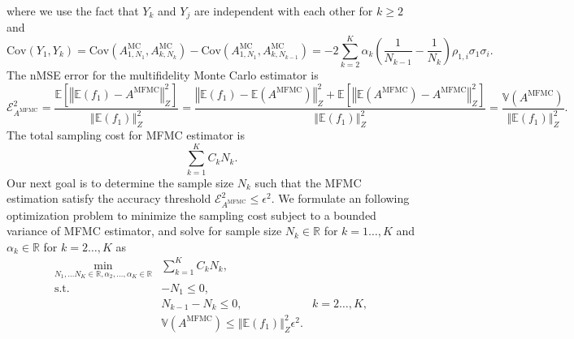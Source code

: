 \documentclass[final,3p,times,11pt]{elsarticle}
\begin{document}
where we use the fact that $Y_k$ and $Y_j$ are independent with each other for $k\ge 2$ and \cite[Lemma~3.2]{PeWiGu:2016}
\[
\text{Cov}(Y_1,Y_k) = \text{Cov}\left(A^{\text{MC}}_{1,N_1},A^{\text{MC}}_{k,N_k}\right) - \text{Cov}\left(A^{\text{MC}}_{1,N_1},A^{\text{MC}}_{k,N_{k-1}}\right) = -2 \sum_{k=2}^K \alpha_k \left(\frac{1}{N_{k-1}} - \frac{1}{N_k}\right)\rho_{1,i}\sigma_1\sigma_i.
\]
The nMSE error for the multifidelity Monte Carlo estimator is
\[
\mathcal{E}_{A^{\text{MFMC}}}^2=\frac{\mathbb E\left[\left\Vert\mathbb{E}(f_1)-A^{\text{MFMC}} \right\Vert_{Z}^2\right]}{\left\Vert\mathbb{E}(f_1) \right\Vert_{Z}^2} = \frac{\left\Vert\mathbb{E}(f_1)-\mathbb{E}(A^{\text{MFMC}}) \right\Vert_{Z}^2+\mathbb E\left[\left\Vert\mathbb{E}(A^{\text{MFMC}})-A^{\text{MFMC}} \right\Vert_{Z}^2\right]}{\left\Vert\mathbb{E}(f_1) \right\Vert_{Z}^2} = \frac{\mathbb{V}\left(A^{\text{MFMC}}\right)}{\left\Vert\mathbb{E}(f_1) \right\Vert_{Z}^2}.
\]
The total sampling cost for MFMC estimator is 
\[
\sum_{k=1}^K C_kN_k.
\]
Our next goal is to determine the sample size $N_k$ such that the MFMC estimation satisfy the accuracy threshold $\mathcal{E}_{A^{\text{MFMC}}}^2\le \epsilon^2$. We formulate an following optimization problem to minimize the sampling cost subject to a bounded variance of MFMC estimator, and solve for sample size $N_k\in \mathbb{R}$ for $k=1\dots, K$ and $\alpha_k\in \mathbb{R}$ for $k=2\dots, K$ as
\begin{equation}\label{eq:Optimization_pb}
    \begin{array}{lll}
    \displaystyle\min_{N_1,\ldots N_K\in \mathbb{R}, \alpha_2,\ldots,\alpha_K\in \mathbb{R}} &\sum_{k=1}^K C_kN_k,\\
       \text{s.t.} &\displaystyle -N_1\le 0, \\%
        &\displaystyle N_{k-1}-N_k\le 0, &k=2\ldots,K,\\
        &\mathbb{V}\left(A^{\text{MFMC}}\right)\le \left\Vert\mathbb{E}(f_1) \right\Vert_{Z}^2\epsilon^2.
    \end{array}
\end{equation}
\end{document}
